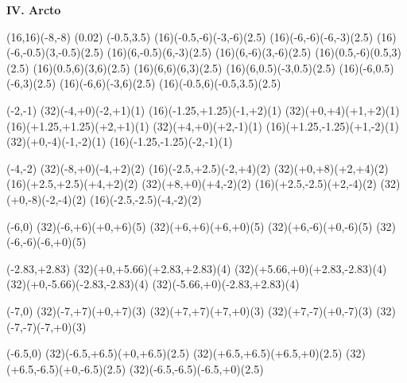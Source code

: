 \begin{center}
{\Huge\bf{IV. Arcto}}
\bigskip

\begin{lapdf}(16,16)(-8,-8)
 \Setwidth(0.02)
 \Black
 \Moveto(-0.5,3.5)
 \Arcto(16)(-0.5,-6)(-3,-6)(2.5)
 \Arcto(16)(-6,-6)(-6,-3)(2.5)
 \Arcto(16)(-6,-0.5)(3,-0.5)(2.5)
 \Arcto(16)(6,-0.5)(6,-3)(2.5)
 \Arcto(16)(6,-6)(3,-6)(2.5)
 \Arcto(16)(0.5,-6)(0.5,3)(2.5)
 \Arcto(16)(0.5,6)(3,6)(2.5)
 \Arcto(16)(6,6)(6,3)(2.5)
 \Arcto(16)(6,0.5)(-3,0.5)(2.5)
 \Arcto(16)(-6,0.5)(-6,3)(2.5)
 \Arcto(16)(-6,6)(-3,6)(2.5)
 \Arcto(16)(-0.5,6)(-0.5,3.5)(2.5)

 \Red
 \Moveto(-2,-1)
 \Arcto(32)(-4,+0)(-2,+1)(1)
 \Arcto(16)(-1.25,+1.25)(-1,+2)(1)
 \Arcto(32)(+0,+4)(+1,+2)(1)
 \Arcto(16)(+1.25,+1.25)(+2,+1)(1)
 \Arcto(32)(+4,+0)(+2,-1)(1)
 \Arcto(16)(+1.25,-1.25)(+1,-2)(1)
 \Arcto(32)(+0,-4)(-1,-2)(1)
 \Arcto(16)(-1.25,-1.25)(-2,-1)(1)

 \Green
 \Moveto(-4,-2)
 \Arcto(32)(-8,+0)(-4,+2)(2)
 \Arcto(16)(-2.5,+2.5)(-2,+4)(2)
 \Arcto(32)(+0,+8)(+2,+4)(2)
 \Arcto(16)(+2.5,+2.5)(+4,+2)(2)
 \Arcto(32)(+8,+0)(+4,-2)(2)
 \Arcto(16)(+2.5,-2.5)(+2,-4)(2)
 \Arcto(32)(+0,-8)(-2,-4)(2)
 \Arcto(16)(-2.5,-2.5)(-4,-2)(2)

 \Blue
 \Moveto(-6,0)
 \Arcto(32)(-6,+6)(+0,+6)(5)
 \Arcto(32)(+6,+6)(+6,+0)(5)
 \Arcto(32)(+6,-6)(+0,-6)(5)
 \Arcto(32)(-6,-6)(-6,+0)(5)

 \Cyan
 \Moveto(-2.83,+2.83)
 \Arcto(32)(+0,+5.66)(+2.83,+2.83)(4)
 \Arcto(32)(+5.66,+0)(+2.83,-2.83)(4)
 \Arcto(32)(+0,-5.66)(-2.83,-2.83)(4)
 \Arcto(32)(-5.66,+0)(-2.83,+2.83)(4)

 \Magenta
 \Moveto(-7,0)
 \Arcto(32)(-7,+7)(+0,+7)(3)
 \Arcto(32)(+7,+7)(+7,+0)(3)
 \Arcto(32)(+7,-7)(+0,-7)(3)
 \Arcto(32)(-7,-7)(-7,+0)(3)

 \Yellow
 \Moveto(-6.5,0)
 \Arcto(32)(-6.5,+6.5)(+0,+6.5)(2.5)
 \Arcto(32)(+6.5,+6.5)(+6.5,+0)(2.5)
 \Arcto(32)(+6.5,-6.5)(+0,-6.5)(2.5)
 \Arcto(32)(-6.5,-6.5)(-6.5,+0)(2.5)
\end{lapdf}
\end{center}

